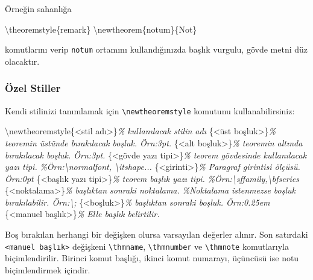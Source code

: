 \documentclass[
  10pt,
]{scrbook}
\newenvironment{Shaded}{\begin{snugshade}}{\end{snugshade}}
\newcommand{\CommentTok}[1]{\textcolor[rgb]{0.56,0.35,0.01}{\textit{#1}}}
\newcommand{\FunctionTok}[1]{\textcolor[rgb]{0.00,0.00,0.00}{#1}}
\newcommand{\NormalTok}[1]{#1}
\theoremstyle{definition}
\theoremstyle{definition}
\theoremstyle{definition}
\theoremstyle{definition}
\theoremstyle{remark}
\begin{document}
Örneğin sahanlığa

\begin{Shaded}
\begin{Highlighting}[]
\FunctionTok{\textbackslash{}theoremstyle}\NormalTok{\{remark\}}
\FunctionTok{\textbackslash{}newtheorem}\NormalTok{\{notum\}\{Not\}}
\end{Highlighting}
\end{Shaded}

komutlarını verip \texttt{notum} ortamını kullandığınızda başlık vurgulu, gövde metni düz olacaktır.

\hypertarget{uxf6zel-stiller}{%
\subsubsection{Özel Stiller}\label{uxf6zel-stiller}}

Kendi stilinizi tanımlamak için \texttt{\textbackslash{}newtheoremstyle} komutunu kullanabilirsiniz:

\begin{Shaded}
\begin{Highlighting}[]
\FunctionTok{\textbackslash{}newtheoremstyle}\NormalTok{\{\textless{}stil adı\textgreater{}\}}\CommentTok{\% kullanılacak stilin adı}
\NormalTok{\{\textless{}üst boşluk\textgreater{}\}}\CommentTok{\% teoremin üstünde bırakılacak boşluk. Örn:3pt.}
\NormalTok{\{\textless{}alt boşluk\textgreater{}\}}\CommentTok{\% teoremin altında bırakılacak boşluk. Örn:3pt.}
\NormalTok{\{\textless{}gövde yazı tipi\textgreater{}\}}\CommentTok{\% teorem gövdesinde kullanılacak yazı tipi.}
 \CommentTok{\%Örn:\textbackslash{}normalfont, \textbackslash{}itshape...}
\NormalTok{\{\textless{}girinti\textgreater{}\}}\CommentTok{\% Paragraf girintisi ölçüsü. Örn:0pt}
\NormalTok{\{\textless{}başlık yazı tipi\textgreater{}\}}\CommentTok{\% teorem başlık yazı tipi.}
 \CommentTok{\%Örn:\textbackslash{}sffamily,\textbackslash{}bfseries}
\NormalTok{\{\textless{}noktalama\textgreater{}\}}\CommentTok{\% başlıktan sonraki noktalama.}
 \CommentTok{\%Noktalama istenmezse boşluk bırakılabilir. Örn:\textbackslash{}; }
\NormalTok{\{\textless{}boşluk\textgreater{}\}}\CommentTok{\% başlıktan sonraki boşluk. Örn:0.25em}
\NormalTok{\{\textless{}manuel başlık\textgreater{}\}}\CommentTok{\% Elle başlık belirtilir.}
\end{Highlighting}
\end{Shaded}

Boş bırakılan herhangi bir değişken olursa varsayılan değerler alınır. Son satırdaki \texttt{\textless{}manuel\ başlık\textgreater{}} değişkeni \texttt{\textbackslash{}thmname}, \texttt{\textbackslash{}thmnumber} ve \texttt{\textbackslash{}thmnote} komutlarıyla biçimlendirilir. Birinci komut başlığı, ikinci komut numarayı, üçüncüsü ise notu biçimlendirmek içindir.
\end{document}
